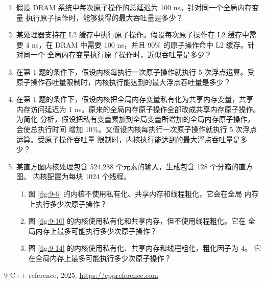 \begin{enumerate}[label=\arabic*.,leftmargin=2.7em]
  \item 假设 DRAM 系统中每次原子操作的总延迟为 100 ns。针对同一个全局内存变量
  执行原子操作时，能够获得的最大吞吐量是多少？

  \item 某处理器支持在 L2 缓存中执行原子操作。假设每次原子操作在 L2 缓存中需要
  4 ns，在 DRAM 中需要 100 ns，并且 90\% 的原子操作命中 L2 缓存。针对同一个
  全局内存变量执行原子操作时，近似吞吐量是多少？

  \item 在第 1 题的条件下，假设内核每执行一次原子操作就执行 5 次浮点运算。受
  原子操作吞吐量限制时，内核执行能达到的最大浮点吞吐量是多少？

  \item 在第 1 题的条件下，假设内核把全局内存变量私有化为共享内存变量，共享
  内存访问延迟为 1 ns。原来的全局内存原子操作全部改成共享内存原子操作。为简化
  分析，假设把私有变量累加到全局变量所增加的全局内存原子操作，会使总执行时间
  增加 10\%。又假设内核每执行一次原子操作就执行 5 次浮点运算。受原子操作吞吐量
  限制时，内核执行能达到的最大浮点吞吐量是多少？

  \item 某直方图内核处理包含 524,288 个元素的输入，生成包含 128 个分箱的直方图。
  内核配置为每块 1024 个线程。
  \begin{enumerate}[label=\alph*.,leftmargin=2.2em]
    \item 图 \ref{fig:9-6} 的内核不使用私有化、共享内存和线程粗化，它会在全局
    内存上执行多少次原子操作？
    \item 图 \ref{fig:9-10} 的内核使用私有化和共享内存，但不使用线程粗化。它在
    全局内存上最多可能执行多少次原子操作？
    \item 图 \ref{fig:9-14} 的内核使用私有化、共享内存和线程粗化，粗化因子为 4。
    它在全局内存上最多可能执行多少次原子操作？
  \end{enumerate}
\end{enumerate}

\begin{chapterbibliography}{9}
  C++ reference, 2025.
  \url{https://cppreference.com}.
\end{chapterbibliography}
